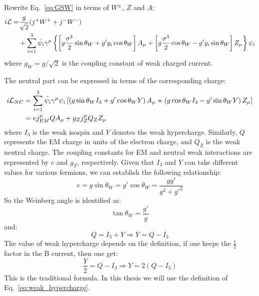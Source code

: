 Rewrite Eq.~\ref{eq:GSW} in terms of $W^\pm$, $Z$ and $A$:
\begin{equation}
    \begin{aligned}
	i\mathcal{L} = &\frac{g}{\sqrt{2}}(j^+W^+ + j^-W^-)	\\
	    &+ \sum_{i=1}^3\bar{\psi}_i\gamma^\mu \left\{ 
		\left[g\frac{\sigma^3}{2}\sin\theta_W + g'y_i\cos\theta_W\right] A_\mu
		+ \left[ g\frac{\sigma^3}{2}\cos\theta_W - g'y_i\sin\theta_W \right] Z_\mu 
	    \right\} \psi_i
    \end{aligned}
\end{equation}
where $g_W = g/\sqrt{2}$ is the coupling constant of weak charged current.

The neutral part can be expressed in terms of the corresponding charge:
\begin{equation}
    \begin{aligned}
	i\mathcal{L}_{NC} &= \sum_{i=1}^{3} \bar{\psi}_i\gamma^\mu\psi_i
	\left[ 
	    \left(g\sin\theta_W I_3 + g'\cos\theta_W Y \right) A_\mu 
	    + \left(g\cos\theta_W I_3 - g'\sin\theta_W Y \right) Z_\mu 
	\right]	\\
	&= ej^\mu_{EM}QA_\mu + g_Zj^\mu_Z Q_Z Z_\mu \\
    \end{aligned}
\end{equation}
where $I_3$ is the weak isospin and $Y$ denotes the weak hypercharge. Similarly, 
$Q$ represents the EM charge in units of the electron charge, and $Q_Z$ is the 
weak neutral charge. The coupling constants for EM and neutral weak interactions
are represented by $e$ and $g_Z$, respectively.
Given that $I_3$ and $Y$ can take different values for various fermions, we 
can establish the following relationship:
\begin{equation}
    e = g\sin\theta_W = g'\cos\theta_W = \frac{gg'}{g^2 + g'^2}
\end{equation}
So the Weinberg angle is identified as:
\begin{equation}
    \tan\theta_W = \frac{g'}{g}
\end{equation}
and: 
\begin{equation}
    Q = I_3 + Y	\Longrightarrow Y = Q - I_3
    \label{eq:weak_hypercharge}
\end{equation}
The value of weak hypercharge depends on the definition, if one keeps the $\frac{1}{2}$
factor in the B current, then one get:
\begin{equation}
    \frac{Y}{2} = Q - I_3   \Rightarrow Y = 2(Q-I_3)
\end{equation}
This is the traditional formula.
In this thesis we will use the definition of Eq.~\ref{eq:weak_hypercharge}.

